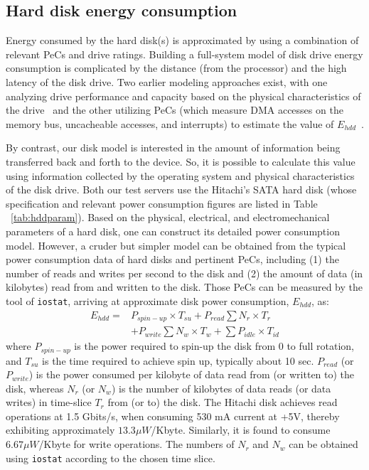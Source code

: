 \documentclass[prodmode,acmtaco,pdftex]{acmsmall}
\begin{document}
\subsection{Hard disk energy consumption}
\label{sec:networkengery}
Energy consumed by the hard disk(s) is approximated by using a
combination of relevant PeCs and drive ratings. Building a full-system
model of disk drive energy consumption is complicated by the distance
(from the processor) and the high latency of the disk drive.  Two
earlier modeling approaches exist, with one analyzing drive performance
and capacity based on the physical characteristics of the
drive~\cite{Gurumurthi2005} and the other utilizing PeCs (which measure
DMA accesses on the memory bus, uncacheable accesses, and interrupts) to
estimate the value of $E_{hdd}$~\cite{Bircher2011}.

By contrast, our disk model is interested in the amount of information
being transferred back and forth to the device.  So, it is possible to
calculate this value using information collected by the operating system
and physical characteristics of the disk drive. Both our test servers
use the Hitachi's SATA hard disk (whose specification and relevant power
consumption figures are listed in Table ~\ref{tab:hddparam}).  Based on
the physical, electrical, and electromechanical parameters of a hard
disk, one can construct its detailed power consumption model.  However,
a cruder but simpler model can be obtained from the typical power
consumption data of hard disks and pertinent PeCs, including (1) the
number of reads and writes per second to the disk and (2) the amount of
data (in kilobytes) read from and written to the disk.  Those PeCs can
be measured by the tool of \texttt{iostat}, arriving at approximate disk
power consumption, $E_{hdd}$, as:
\begin{align*}
\label{eq:hddpwr1}
E_{hdd} = &P_{spin-up}\times T_{su}+  P_{read}\sum N_r\times T_r \nonumber\\
        &+ P_{write}\sum N_w\times T_w+ \sum P_{idle}\times T_{id}
\end{align*}
where $P_{spin-up}$ is the power required to spin-up the disk from 0 to
full rotation, and $T_{su}$ is the time required to achieve spin up,
typically about 10 sec.  $P_{read}$ (or $P_{write}$) is the power
consumed per kilobyte of data read from (or written to) the disk,
whereas $N_r$ (or $N_w$) is the number of kilobytes of data reads (or
data writes) in time-slice $T_r$ from (or to) the disk.  The Hitachi
disk achieves read operations at 1.5 Gbits/s, when consuming 530 mA
current at +5V, thereby exhibiting approximately $13.3 \mu W$/Kbyte.
Similarly, it is found to consume $6.67 \mu W$/Kbyte for write
operations.  The numbers of $N_r$ and $N_w$ can be obtained using
\texttt{iostat} according to the chosen time slice.
\end{document}
